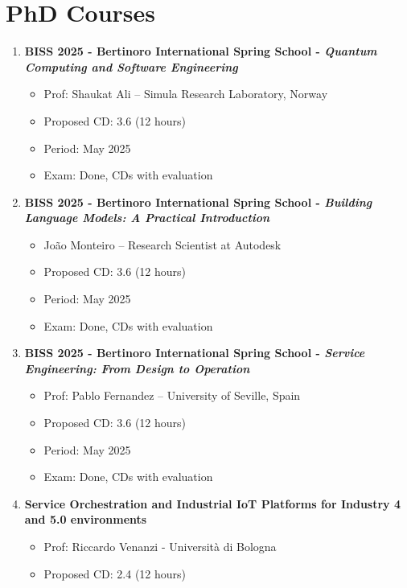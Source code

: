 \documentclass[runningheads]{llncs}
\begin{document}
    \section{PhD Courses}

    \begin{enumerate}
        \item \textbf{BISS 2025 - Bertinoro International Spring School - \textit{Quantum Computing and Software Engineering}}
        \begin{itemize}
            \item Prof: Shaukat Ali -- Simula Research Laboratory, Norway
            \item Proposed CD: 3.6 (12 hours)
            \item Period: May 2025
            \item Exam: Done, CDs with evaluation
        \end{itemize}
        \item \textbf{BISS 2025 - Bertinoro International Spring School - \textit{Building Language Models: A Practical Introduction}}
        \begin{itemize}
            \item João Monteiro -- Research Scientist at Autodesk
            \item Proposed CD: 3.6 (12 hours)
            \item Period: May 2025
            \item Exam: Done, CDs with evaluation
        \end{itemize}
        \item \textbf{BISS 2025 - Bertinoro International Spring School - \textit{Service Engineering: From Design to Operation}}
        \begin{itemize}
            \item Prof: Pablo Fernandez -- University of Seville, Spain
            \item Proposed CD: 3.6 (12 hours)
            \item Period: May 2025
            \item Exam: Done, CDs with evaluation
        \end{itemize}
        \item \textbf{Service Orchestration and Industrial IoT Platforms for Industry 4 and 5.0 environments}
        \begin{itemize}
            \item Prof: Riccardo Venanzi - Università di Bologna
            \item Proposed CD: 2.4 (12 hours)

\end{itemize}
\end{enumerate}
\end{document}
